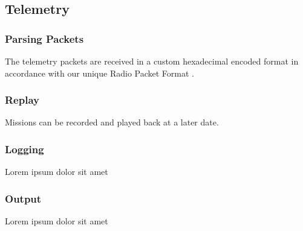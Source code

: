 \subsectionfont{\fontsize{14}{14}\selectfont}

\subsection{Telemetry}

\subsubsection{Parsing Packets}
The telemetry packets are received in a custom hexadecimal encoded format in accordance with our unique Radio Packet Format \cite{radio_packet_format}.

\subsubsection{Replay}
Missions can be recorded and played back at a later date. 

\subsubsection{Logging}
Lorem ipsum dolor sit amet

\subsubsection{Output}
Lorem ipsum dolor sit amet
